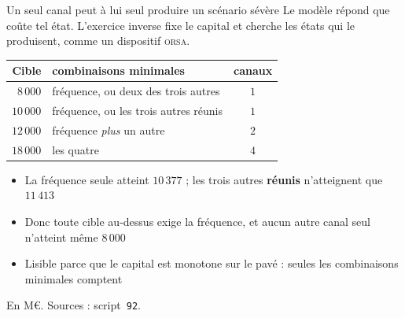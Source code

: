\documentclass[11pt]{beamer}
\begin{document}
\begin{frame}{Un seul canal peut à lui seul produire un scénario sévère}
\small
Le modèle répond \og{}que coûte tel état\fg{}. L'exercice inverse fixe le capital et cherche les
états qui le produisent, comme un dispositif \textsc{orsa}.
\vspace{1mm}

\begin{center}\small
\begin{tabular}{@{}r l c@{}}
\toprule
\textbf{Cible} & \textbf{combinaisons minimales} & \textbf{canaux} \\
\midrule
$8\,000$ & fréquence, ou deux des trois autres & $1$ \\
$10\,000$ & fréquence, ou les trois autres réunis & $1$ \\
$12\,000$ & fréquence \emph{plus} un autre & $2$ \\
$18\,000$ & les quatre & $4$ \\
\bottomrule
\end{tabular}
\end{center}
\vspace{2mm}

\begin{itemize}\itemsep4pt
  \item La fréquence seule atteint $10\,377$ ; les trois autres \textbf{réunis} n'atteignent
        que $11\,413$
  \item \alert{Donc toute cible au-dessus exige la fréquence}, et aucun autre canal seul
        n'atteint même $8\,000$
  \item Lisible parce que le capital est monotone sur le pavé : seules les combinaisons
        minimales comptent
\end{itemize}
\vspace{1mm}
{\scriptsize En M\euro. Sources : script~\texttt{92}.}
\end{frame}
\end{document}
